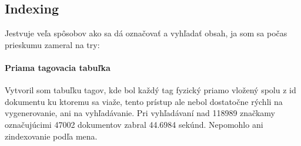\subsection{Indexing}

Jestvuje veľa spôsobov ako sa dá označovať a vyhľadať obsah, ja som sa počas prieskumu zameral na try:

\paragraph{Priama tagovacia tabuľka}

Vytvoril som tabuľku tagov, kde bol každý tag fyzický priamo vložený spolu z id dokumentu ku ktoremu sa viaže,
tento prístup ale nebol dostatočne rýchli na vygenerovanie, ani na vyhľadávanie. Pri vyhľadávaní nad 118989 značkamy 
označujúcimi 47002 dokumentov zabral 44.6984 sekúnd. Nepomohlo ani zindexovanie podľa mena.


